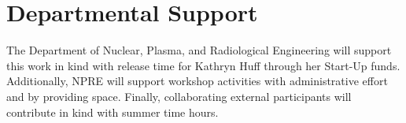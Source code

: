 \documentclass[11pt]{article}
\begin{document}
          \section*{Departmental Support}
          The Department of Nuclear, Plasma, and Radiological Engineering will 
          support this work in kind with release time for Kathryn Huff through 
          her Start-Up funds.  Additionally, NPRE will support workshop activities 
          with administrative effort and by providing space. Finally, 
          collaborating external participants will contribute in kind with 
          summer time hours.


          
          


          
\end{document}
